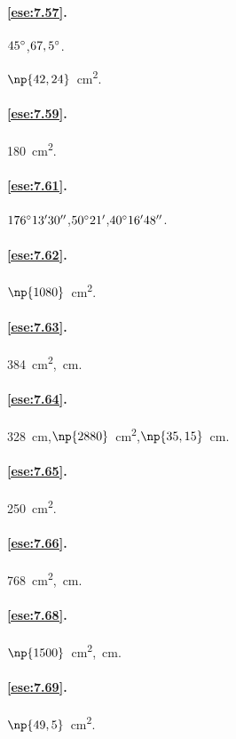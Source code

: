\paragraph{\ref{ese:7.57}.}
$45{}^{\circ}$,\quad $67,5{}^{\circ}$.

$\np{42,24}$~cm\textsuperscript{2}.

\paragraph{\ref{ese:7.59}.}
180~cm\textsuperscript{2}.

\paragraph{\ref{ese:7.61}.}
$176{}^{\circ}13'30''$,\quad $50{}^{\circ}21'$,\quad $40{}^{\circ}16'48''$.

\paragraph{\ref{ese:7.62}.}
$\np{1080}$~cm\textsuperscript{2}.

\paragraph{\ref{ese:7.63}.}
384~cm\textsuperscript{2},~cm.

\paragraph{\ref{ese:7.64}.}
328~cm,\quad $\np{2880}$~cm\textsuperscript{2},\quad $\np{35,15}$~cm.

\paragraph{\ref{ese:7.65}.}
250~cm\textsuperscript{2}.

\paragraph{\ref{ese:7.66}.}
768~cm\textsuperscript{2},~cm.

\paragraph{\ref{ese:7.68}.}
$\np{1500}$~cm\textsuperscript{2},~cm.

\paragraph{\ref{ese:7.69}.}
$\np{49,5}$~cm\textsuperscript{2}.

